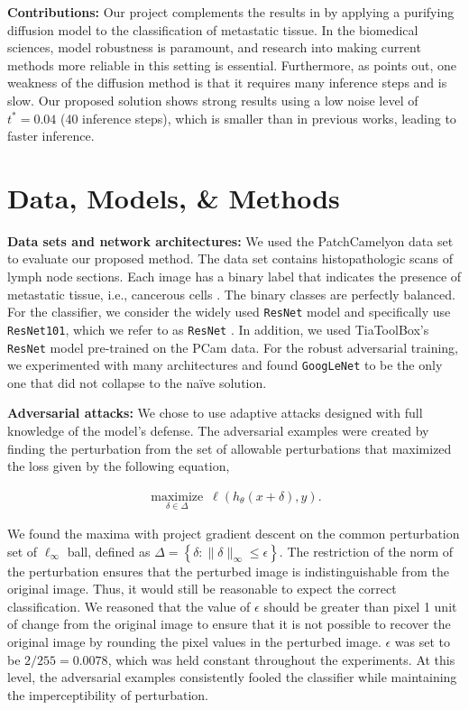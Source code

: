 \documentclass[twocolumn]{article}
\begin{document}
\textbf{Contributions:} Our project complements the results in \cite{DiffPure} by applying a purifying diffusion model to the classification of metastatic tissue. In the biomedical sciences, model robustness is paramount, and research into making current methods more reliable in this setting is essential. Furthermore, as \cite{DiffPure} points out, one weakness of the diffusion method is that it requires many inference steps and is slow. Our proposed solution shows strong results using a low noise level of $t^*=0.04$ (40 inference steps), which is smaller than in previous works, leading to faster inference.


\section{Data, Models, \& Methods}
\label{sec:methods}

\textbf{Data sets and network architectures:} We used the PatchCamelyon data set to evaluate our proposed method. The data set contains histopathologic scans of lymph node sections. Each image has a binary label that indicates the presence of metastatic tissue, i.e., cancerous cells \cite{Pocock2022}. The binary classes are perfectly balanced. For the classifier, we consider the widely used \texttt{ResNet} model and specifically use \texttt{ResNet101}, which we refer to as \texttt{ResNet} \cite{ResNet}. In addition, we used TiaToolBox's \texttt{ResNet} model pre-trained on the PCam data. For the robust adversarial training, we experimented with many architectures and found \texttt{GoogLeNet}\cite{szegedy2015going} to be the only one that did not collapse to the naïve solution.

\textbf{Adversarial attacks:}
We chose to use adaptive attacks designed with full knowledge of the model's defense. The adversarial examples were created by finding the perturbation from the set of allowable perturbations that maximized the loss given by the following equation,

\begin{align}
    \underset{\delta \in \Delta}{\operatorname{maximize}} \: \ell\left(h_\theta(x+\delta), y\right).
\end{align}

We found the maxima with project gradient descent on the common perturbation set of $\ell_{\infty}$ ball, defined as $\Delta=\left\{\delta:\|\delta\|_{\infty} \leq \epsilon\right\}$. The restriction of the norm of the perturbation ensures that the perturbed image is indistinguishable from the original image. Thus, it would still be reasonable to expect the correct classification. We reasoned that the value of $\epsilon$ should be greater than pixel 1 unit of change from the original image to ensure that it is not possible to recover the original image by rounding the pixel values in the perturbed image. $\epsilon$ was set to be $2/255 = 0.0078$, which was held constant throughout the experiments. At this level, the adversarial examples consistently fooled the classifier while maintaining the imperceptibility of perturbation.
\end{document}

